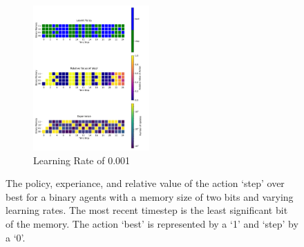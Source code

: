 \documentclass[a4paper]{article}
\begin{document}
\begin{figure}[ht]
    \begin{subfigure}[b]{0.24\textwidth}
        \centering
        \includegraphics[width=12em]{../figures/policy_b2_lr001.pdf}
        \caption{Learning Rate of 0.001}
        \label{b2_lr001}
    \end{subfigure}
    \caption{
        The policy, experiance, and relative value of the action `step'
        over best for a binary agents with a memory size of two bits
        and varying learning rates. The most recent timestep
        is the least significant bit of the memory.
        The action `best' is represented by a `1' and `step' by a `0'.
    }
    \label{policy_b2}
\end{figure}
\end{document}
